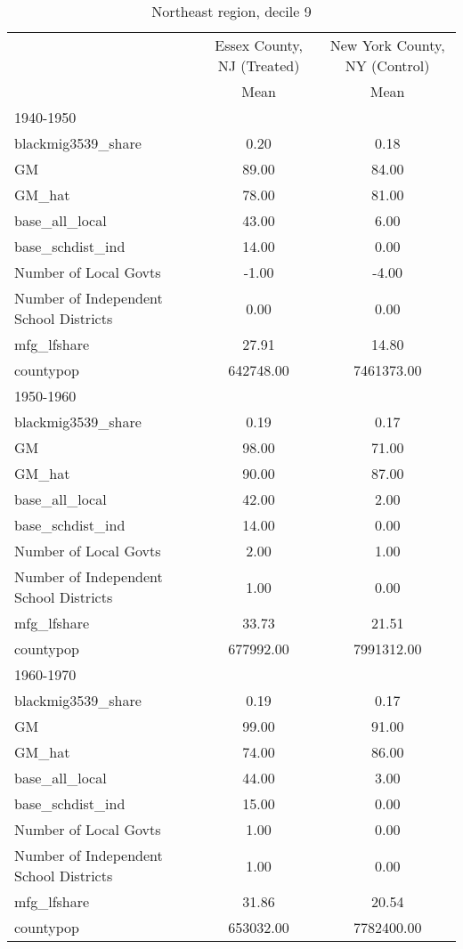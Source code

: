 \begin{table}[htbp]\centering
\def\sym#1{\ifmmode^{#1}\else\(^{#1}\)\fi}
\caption{Northeast region, decile 9 \label{tab1}}
\begin{tabular}{l*{2}{c}}
\toprule
                    &\multicolumn{1}{c}{Essex County, NJ (Treated)}&\multicolumn{1}{c}{New York County, NY (Control)}\\
                    &        Mean&        Mean\\
\midrule
1940-1950           &            &            \\
blackmig3539\_share  &        0.20&        0.18\\
GM                  &       89.00&       84.00\\
GM\_hat              &       78.00&       81.00\\
base\_all\_local      &       43.00&        6.00\\
base\_schdist\_ind    &       14.00&        0.00\\
Number of Local Govts&       -1.00&       -4.00\\
Number of Independent School Districts&        0.00&        0.00\\
mfg\_lfshare         &       27.91&       14.80\\
countypop           &   642748.00&  7461373.00\\
\midrule
1950-1960           &            &            \\
blackmig3539\_share  &        0.19&        0.17\\
GM                  &       98.00&       71.00\\
GM\_hat              &       90.00&       87.00\\
base\_all\_local      &       42.00&        2.00\\
base\_schdist\_ind    &       14.00&        0.00\\
Number of Local Govts&        2.00&        1.00\\
Number of Independent School Districts&        1.00&        0.00\\
mfg\_lfshare         &       33.73&       21.51\\
countypop           &   677992.00&  7991312.00\\
\midrule
1960-1970           &            &            \\
blackmig3539\_share  &        0.19&        0.17\\
GM                  &       99.00&       91.00\\
GM\_hat              &       74.00&       86.00\\
base\_all\_local      &       44.00&        3.00\\
base\_schdist\_ind    &       15.00&        0.00\\
Number of Local Govts&        1.00&        0.00\\
Number of Independent School Districts&        1.00&        0.00\\
mfg\_lfshare         &       31.86&       20.54\\
countypop           &   653032.00&  7782400.00\\
\bottomrule
\end{tabular}
\end{table}
